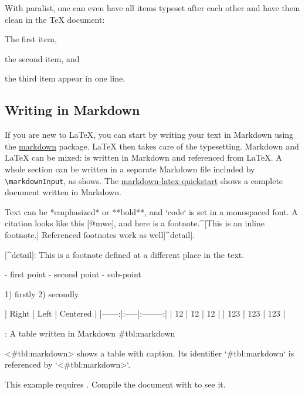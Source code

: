With paralist, one can even have all items typeset after each other and have them clean in the TeX document:

\begin{ltgexample}
\begin{inparaenum}
  \item The first item,
  \item the second item, and
  \item the third item appear in one line.
\end{inparaenum}
\end{ltgexample}

\subsection{Writing in Markdown}\label{sec:markdown}

\ifluatex
  If you are new to \LaTeX{}, you can start by writing your text in Markdown using the \href{https://ctan.org/pkg/markdown}{markdown} package.
  \LaTeX{} then takes care of the typesetting.
  Markdown and \LaTeX{} can be mixed:
   is written in Markdown and referenced from \LaTeX{}.
  A whole section can be written in a separate Markdown file included by \verb|\markdownInput|, as  shows.
  The \href{https://github.com/latextemplates/markdown-latex-quickstart}{markdown-latex-quickstart} shows a complete document written in Markdown.

  \begin{ltgexample}
  \begin{markdown}
Text can be *emphasized* or **bold**, and `code` is set in a monospaced font.
A citation looks like this [@mwe], and here is a footnote.^[This is an inline footnote.]
Referenced footnotes work as well[^detail].

[^detail]: This is a footnote defined at a different place in the text.

- first point
- second point
  - sub-point

1) firstly
2) secondly

| Right | Left | Centered |
|------:|:-----|:--------:|
|    12 | 12   |    12    |
|   123 | 123  |   123    |

: A table written in Markdown {#tbl:markdown}

<#tbl:markdown> shows a table with caption.
Its identifier `{#tbl:markdown}` is referenced by `<#tbl:markdown>`.
\end{markdown}
  \end{ltgexample}
\else
  This example requires .
  Compile the document with  to see it.
\fi

